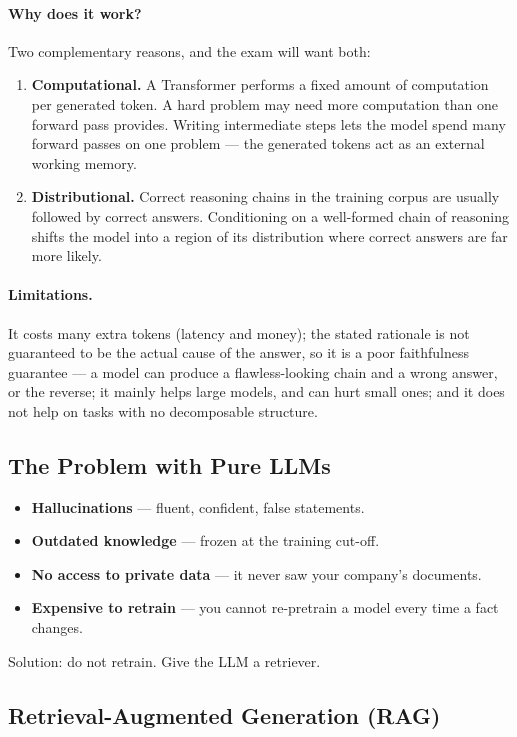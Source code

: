 \documentclass[11pt,a4paper]{article}
\begin{document}
\paragraph{Why does it work?} Two complementary reasons, and the exam will want both:
\begin{enumerate}
\item \textbf{Computational.} A Transformer performs a fixed amount of computation per
  generated token. A hard problem may need more computation than one forward pass provides.
  Writing intermediate steps lets the model spend many forward passes on one problem --- the
  generated tokens act as an external working memory.
\item \textbf{Distributional.} Correct reasoning chains in the training corpus are usually
  followed by correct answers. Conditioning on a well-formed chain of reasoning shifts the
  model into a region of its distribution where correct answers are far more likely.
\end{enumerate}

\paragraph{Limitations.} It costs many extra tokens (latency and money); the stated rationale
is not guaranteed to be the actual cause of the answer, so it is a poor faithfulness guarantee
--- a model can produce a flawless-looking chain and a wrong answer, or the reverse; it mainly
helps large models, and can hurt small ones; and it does not help on tasks with no decomposable
structure.

\subsection{The Problem with Pure LLMs}

\begin{itemize}
\item \textbf{Hallucinations} --- fluent, confident, false statements.
\item \textbf{Outdated knowledge} --- frozen at the training cut-off.
\item \textbf{No access to private data} --- it never saw your company's documents.
\item \textbf{Expensive to retrain} --- you cannot re-pretrain a model every time a fact
  changes.
\end{itemize}
Solution: do not retrain. Give the LLM a retriever.

\subsection{Retrieval-Augmented Generation (RAG)}
\end{document}

